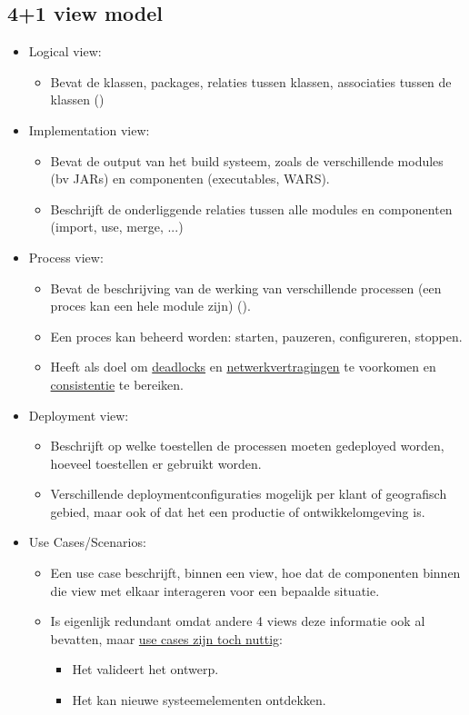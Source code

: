 \documentclass{report}
\begin{document}
	\subsection{4+1 view model}
	\begin{itemize}
		\item[\info] Logical view:
			\begin{itemize}
				\item[\info] Bevat de klassen, packages, relaties tussen klassen, associaties tussen de klassen ()
			\end{itemize}
		\item[\info] Implementation view:
			\begin{itemize}
				\item[\info] Bevat de output van het build systeem, zoals de verschillende modules (bv JARs) en componenten (executables, WARS).
				\item[\info] Beschrijft de onderliggende relaties tussen alle modules en componenten (import, use, merge, ...)
			\end{itemize}
		\item[\info] Process view:
			\begin{itemize}
				\item[\info] Bevat de beschrijving van de werking van verschillende processen (een proces kan een hele module zijn) ().
				\item[\info] Een proces kan beheerd worden: starten, pauzeren, configureren, stoppen.
				\item[\info] Heeft als doel om \underline{deadlocks} en \underline{netwerkvertragingen} te voorkomen en \underline{consistentie} te bereiken. 
			\end{itemize}
		\item[\info] Deployment view:
			\begin{itemize}
				\item[\info] Beschrijft op welke toestellen de processen moeten gedeployed worden, hoeveel toestellen er gebruikt worden.
				\item[\info] Verschillende deploymentconfiguraties mogelijk per klant of geografisch gebied, maar ook of dat het een productie of ontwikkelomgeving is.
			\end{itemize}
		\item[\info]  Use Cases/Scenarios:
			\begin{itemize}
				\item[\info] Een use case beschrijft, binnen een view, hoe dat de componenten binnen die view met elkaar interageren voor een bepaalde situatie.
				\item[\info] Is eigenlijk redundant omdat andere 4 views deze informatie ook al bevatten, maar \underline{use cases zijn toch nuttig}:
				\begin{itemize}
					\item[\good] Het valideert het ontwerp.
					\item[\good] Het kan nieuwe systeemelementen ontdekken.
				\end{itemize}
			\end{itemize}
	\end{itemize}
\end{document}
